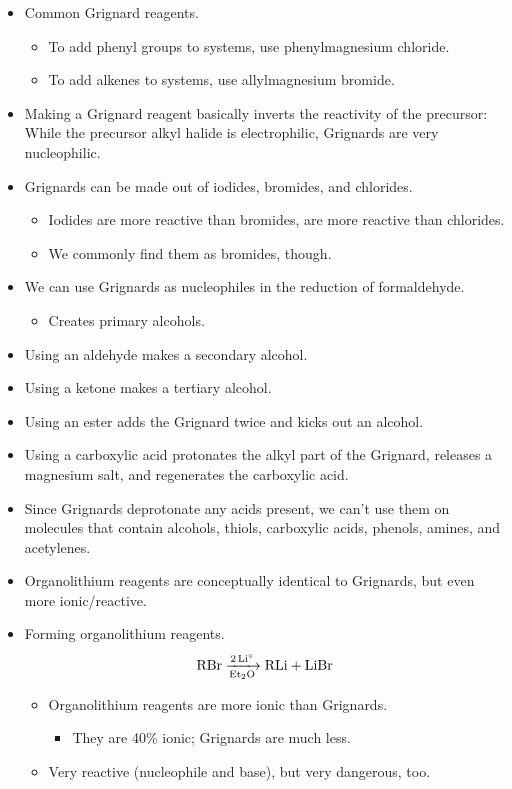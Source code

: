 \documentclass[../notes.tex]{subfiles}
\begin{document}
\begin{itemize}
\begin{itemize}
\begin{itemize}
        \end{itemize}
    \end{itemize}
    \item Common Grignard reagents.
    \begin{itemize}
        \item To add phenyl groups to systems, use phenylmagnesium chloride.
        \item To add alkenes to systems, use allylmagnesium bromide.
    \end{itemize}
    \item Making a Grignard reagent basically inverts the reactivity of the precursor: While the precursor alkyl halide is electrophilic, Grignards are very nucleophilic.
    \item Grignards can be made out of iodides, bromides, and chlorides.
    \begin{itemize}
        \item Iodides are more reactive than bromides, are more reactive than chlorides.
        \item We commonly find them as bromides, though.
    \end{itemize}
    \item We can use Grignards as nucleophiles in the reduction of formaldehyde.
    \begin{itemize}
        \item Creates primary alcohols.
    \end{itemize}
    \item Using an aldehyde makes a secondary alcohol.
    \item Using a ketone makes a tertiary alcohol.
    \item Using an ester adds the Grignard twice and kicks out an alcohol.
    \item Using a carboxylic acid protonates the alkyl part of the Grignard, releases a magnesium salt, and regenerates the carboxylic acid.
    \item Since Grignards deprotonate any acids present, we can't use them on molecules that contain alcohols, thiols, carboxylic acids, phenols, amines, and acetylenes.
    \item Organolithium reagents are conceptually identical to Grignards, but even more ionic/reactive.
    \item Forming organolithium reagents.
    \begin{equation*}
        \ce{RBr ->[2Li${}^\circ$][Et2O] RLi + LiBr}
    \end{equation*}
    \begin{itemize}
        \item Organolithium reagents are more ionic than Grignards.
        \begin{itemize}
            \item They are 40\% ionic; Grignards are much less.
        \end{itemize}
        \item Very reactive (nucleophile and base), but very dangerous, too.
    \end{itemize}
\end{itemize}
\end{document}
